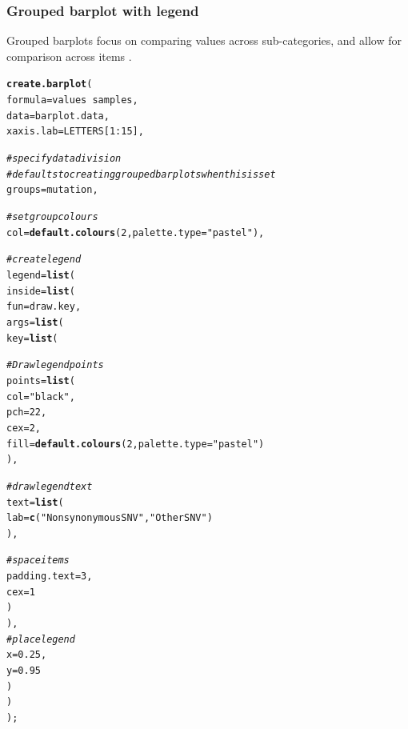 \documentclass[letterpaper]{article}\usepackage[]{graphicx}\usepackage[]{color}
\makeatletter
\newcommand{\hlnum}[1]{\textcolor[rgb]{0.686,0.059,0.569}{#1}}%
\newcommand{\hlstr}[1]{\textcolor[rgb]{0.192,0.494,0.8}{#1}}%
\newcommand{\hlcom}[1]{\textcolor[rgb]{0.678,0.584,0.686}{\textit{#1}}}%
\newcommand{\hlopt}[1]{\textcolor[rgb]{0,0,0}{#1}}%
\newcommand{\hlstd}[1]{\textcolor[rgb]{0.345,0.345,0.345}{#1}}%
\newcommand{\hlkwc}[1]{\textcolor[rgb]{0.333,0.667,0.333}{#1}}%
\newcommand{\hlkwd}[1]{\textcolor[rgb]{0.737,0.353,0.396}{\textbf{#1}}}%
\newenvironment{kframe}{%
 \def\at@end@of@kframe{}%
 \ifinner\ifhmode%
  \def\at@end@of@kframe{\end{minipage}}%
  \begin{minipage}{\columnwidth}%
 \fi\fi%
 \def\FrameCommand##1{\hskip\@totalleftmargin \hskip-\fboxsep
 \colorbox{shadecolor}{##1}\hskip-\fboxsep
     \hskip-\linewidth \hskip-\@totalleftmargin \hskip\columnwidth}%
 \MakeFramed {\advance\hsize-\width
   \@totalleftmargin\z@ \linewidth\hsize
   \@setminipage}}%
 {\par\unskip\endMakeFramed%
 \at@end@of@kframe}
\newenvironment{knitrout}{}{} %
\makeatother
\begin{document}
\subsubsection{Grouped barplot with legend}
Grouped barplots focus on comparing values across sub-categories, and allow  for comparison across items \cite{streit}.

\begin{knitrout}
\color{fgcolor}\begin{kframe}
\begin{alltt}
\hlkwd{create.barplot}\hlstd{(}
    \hlkwc{formula} \hlstd{= values} \hlopt{~} \hlstd{samples,}
    \hlkwc{data} \hlstd{= barplot.data,}
    \hlkwc{xaxis.lab} \hlstd{= LETTERS[}\hlnum{1}\hlopt{:}\hlnum{15}\hlstd{],}

    \hlcom{# specify data division}
    \hlcom{# defaults to creating grouped bar plots when this is set}
    \hlkwc{groups} \hlstd{= mutation,}

    \hlcom{# set group colours}
    \hlkwc{col} \hlstd{=} \hlkwd{default.colours}\hlstd{(}\hlnum{2}\hlstd{,} \hlkwc{palette.type} \hlstd{=} \hlstr{"pastel"}\hlstd{),}

    \hlcom{# create legend }
    \hlkwc{legend} \hlstd{=} \hlkwd{list}\hlstd{(}
        \hlkwc{inside} \hlstd{=} \hlkwd{list}\hlstd{(}
            \hlkwc{fun} \hlstd{= draw.key,}
            \hlkwc{args} \hlstd{=} \hlkwd{list}\hlstd{(}
                \hlkwc{key} \hlstd{=} \hlkwd{list}\hlstd{(}

                    \hlcom{# Draw legend points}
                    \hlkwc{points} \hlstd{=} \hlkwd{list}\hlstd{(}
                        \hlkwc{col} \hlstd{=} \hlstr{"black"}\hlstd{,}
                        \hlkwc{pch} \hlstd{=} \hlnum{22}\hlstd{,}
                        \hlkwc{cex} \hlstd{=} \hlnum{2}\hlstd{,}
                        \hlkwc{fill} \hlstd{=} \hlkwd{default.colours}\hlstd{(}\hlnum{2}\hlstd{,} \hlkwc{palette.type} \hlstd{=} \hlstr{"pastel"}\hlstd{)}
                        \hlstd{),}

                    \hlcom{# draw legend text}
                    \hlkwc{text} \hlstd{=} \hlkwd{list}\hlstd{(}
                        \hlkwc{lab} \hlstd{=} \hlkwd{c}\hlstd{(}\hlstr{"Nonsynonymous SNV"}\hlstd{,} \hlstr{"Other SNV"}\hlstd{)}
                        \hlstd{),}

                    \hlcom{# space items}
                    \hlkwc{padding.text} \hlstd{=} \hlnum{3}\hlstd{,}
                    \hlkwc{cex} \hlstd{=} \hlnum{1}
                    \hlstd{)}
                \hlstd{),}
            \hlcom{# place legend}
            \hlkwc{x} \hlstd{=} \hlnum{0.25}\hlstd{,}
            \hlkwc{y} \hlstd{=} \hlnum{0.95}
            \hlstd{)}
        \hlstd{)}
    \hlstd{);}
\end{alltt}
\end{kframe}\begin{figure}


\end{figure}
\end{knitrout}
\end{document}
